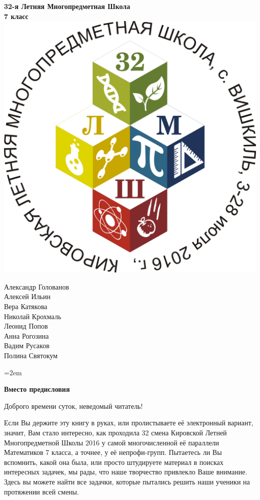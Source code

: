 \documentclass[10pt]{book}
\begin{document}
\begin{center}
	\Huge{\bf 32-я Летняя Многопредметная Школа}\\
	\Large{\bf 7 класс}\\ \vspace{.3cm}
	\includegraphics[width=\textwidth]{logo}
	\begin{multicols}{2}
		Александр Голованов \\
		Алексей Ильин \\
		Вера Катякова \\
		Николай Крохмаль \\
		Леонид Попов \\
		Анна Рогозина \\
		Вадим Русаков \\
		Полина Святокум \\
	\end{multicols}
\end{center}

\newpage

\parindent=2em

\Large{\bf Вместо предисловия}
\normalsize

Доброго времени суток, неведомый читатель!

Если Вы держите эту книгу в руках, или пролистываете её электронный вариант, значит, Вам стало интересно, как проходила 32 смена Кировской Летней Многопредметной Школы 2016 у самой многочисленной её параллели Математиков 7 класса, а точнее, у её непрофи-групп. Пытаетесь ли  Вы вспомнить, какой она была, или просто штудируете материал в поисках интересных задачек, мы рады, что наше творчество привлекло Ваше внимание. Здесь вы можете найти все задачки, которые пытались решить наши ученики на протяжении всей смены.
\end{document}
